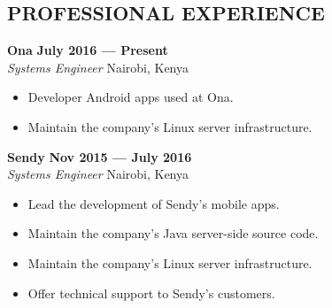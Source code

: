 \documentclass{res}
\begin{document}
\thispagestyle{empty} %

\address{P.O. Box 55050(00200) \\ Nairobi, Kenya \\ +254715023805}

\address{jasonrogena@gmail.com}


 \begin{resume}

\section{PROFESSIONAL EXPERIENCE}

\vspace{8pt}
\textbf{Ona} \hfill        \textbf{July 2016 --- Present} \\
\emph{Systems Engineer}       \hfill  Nairobi, Kenya

\begin{itemize} \itemsep -2pt %
	\item Developer Android apps used at Ona.
	\item Maintain the company's Linux server infrastructure.
 \end{itemize} \vspace{-4pt}

\vspace{8pt}
\textbf{Sendy} \hfill        \textbf{Nov 2015 --- July 2016} \\
\emph{Systems Engineer}       \hfill Nairobi, Kenya

\begin{itemize} \itemsep -2pt %
	\item Lead the development of Sendy’s mobile apps.
	\item Maintain the company’s Java server-side source code.
          \item Maintain the company’s Linux server infrastructure.
	\item Offer technical support to Sendy’s customers.
 \end{itemize} \vspace{-4pt}


\end{resume}
\end{document}
